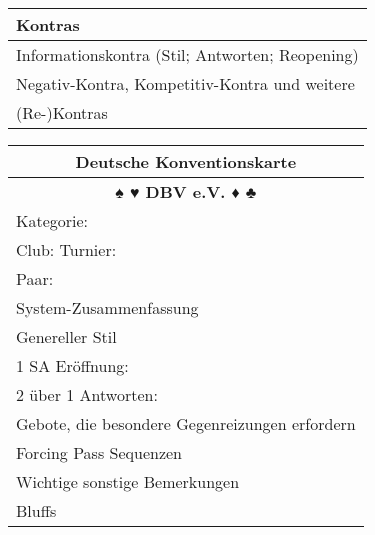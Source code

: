 \documentclass{article}
\begin{document}
\begin{multicols}{3}
\begin{tabular}{|l|l|l|}
\hline \multicolumn{3}{|l|}{Kontras} \\
\hline \multicolumn{3}{|l|}{Informationskontra (Stil; Antworten; Reopening)} \\
\hline \multicolumn{3}{|l|}{Negativ-Kontra, Kompetitiv-Kontra und weitere} \\
       \multicolumn{3}{|l|}{(Re-)Kontras} \\
\hline \end{tabular}

\begin{tabular}{|l|}
\hline \multicolumn{1}{c}{\bf Deutsche Konventionskarte} \\
\hline \multicolumn{1}{c}{\bf ♠ ♥ DBV e.V. ♦ ♣} \\
\hline Kategorie: \\
\hline Club: Turnier: \\
\hline Paar: \\

\hline System-Zusammenfassung \\
\hline Genereller Stil \\
\hline 1 SA Eröffnung: \\
\hline 2 über 1 Antworten: \\
\hline Gebote, die besondere Gegenreizungen erfordern \\
\hline Forcing Pass Sequenzen \\
\hline Wichtige sonstige Bemerkungen \\
\hline Bluffs \\
\hline \end{tabular}

\end{multicols}
\end{document}
